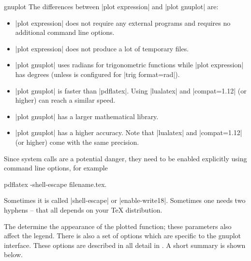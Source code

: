 {\begin{addplotoperation}[]{gnuplot}{}
    The differences between |plot expression| and |plot gnuplot| are:
    \begin{itemize}
        \item |plot expression| does not require any external programs and
            requires no additional command line options.
        \item |plot expression| does not produce a lot of temporary files.
        \item |plot gnuplot| uses radians for trigonometric functions while
            |plot expression| has degrees (unless \pgfname{} is configured
            for |trig format=rad|).
        \item |plot gnuplot| is faster than |pdflatex|. Using |lualatex| and
            |compat=1.12| (or higher) can reach a similar speed.
        \item |plot gnuplot| has a larger mathematical library.
        \item |plot gnuplot| has a higher accuracy. Note that |lualatex| and
            |compat=1.12| (or higher) come with the same precision.
    \end{itemize}

    Since system calls are a potential danger, they need to be enabled
    explicitly using command line options, for example
\begin{codeexample}
pdflatex -shell-escape filename.tex.
\end{codeexample}
    Sometimes it is called |shell-escape| or |enable-write18|. Sometimes one
    needs two hyphens -- that all depends on your \TeX{} distribution.
\begin{codeexample}[]
\end{codeexample}

\begin{codeexample}[]
\end{codeexample}

    The  determine the appearance of the plotted function; these
    parameters also affect the legend. There is also a set of options which are
    specific to the gnuplot interface. These options are described in all
    detail in \cite[Section~18.6]{tikz}. A short summary is shown below.


\end{addplotoperation}}
